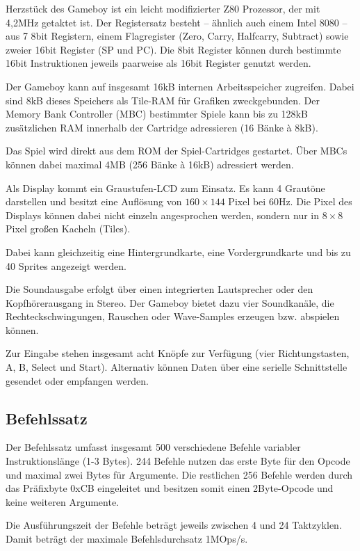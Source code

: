 \documentclass[a4paper]{scrartcl}
\begin{document}
Herzstück des Gameboy ist ein leicht modifizierter Z80 Prozessor, der mit 4,2MHz getaktet ist. Der Registersatz besteht -- ähnlich auch einem Intel 8080 -- aus 7 8bit Registern, einem Flagregister (Zero, Carry, Halfcarry, Subtract) sowie zweier 16bit Register (SP und PC). Die 8bit Register können durch bestimmte 16bit Instruktionen jeweils paarweise als 16bit Register genutzt werden.

Der Gameboy kann auf insgesamt 16kB internen Arbeitsspeicher zugreifen. Dabei sind 8kB dieses Speichers als Tile-RAM für Grafiken zweckgebunden. Der Memory Bank Controller (MBC) bestimmter Spiele kann bis zu 128kB zusätzlichen RAM innerhalb der Cartridge adressieren (16 Bänke à 8kB).

Das Spiel wird direkt aus dem ROM der Spiel-Cartridges gestartet. Über MBCs können dabei maximal 4MB (256 Bänke à 16kB) adressiert werden.

Als Display kommt ein Graustufen-LCD zum Einsatz. Es kann 4 Grautöne darstellen und besitzt eine Auflösung von $160 \times 144$ Pixel bei 60Hz. Die Pixel des Displays können dabei nicht einzeln angesprochen werden, sondern nur in $8 \times 8$ Pixel großen Kacheln (Tiles).

Dabei kann gleichzeitig eine Hintergrundkarte, eine Vordergrundkarte und bis zu 40 Sprites angezeigt werden.

Die Soundausgabe erfolgt über einen integrierten Lautsprecher oder den Kopfhörerausgang in Stereo. Der Gameboy bietet dazu vier Soundkanäle, die Rechteckschwingungen, Rauschen oder Wave-Samples erzeugen bzw. abspielen können.

Zur Eingabe stehen insgesamt acht Knöpfe zur Verfügung (vier Richtungstasten, A, B, Select und Start). Alternativ können Daten über eine serielle Schnittstelle gesendet oder empfangen werden.
\subsection{Befehlssatz}

Der Befehlssatz umfasst insgesamt 500 verschiedene Befehle variabler Instruktionslänge (1-3 Bytes). 244 Befehle nutzen das erste Byte für den Opcode und maximal zwei Bytes für Argumente. Die restlichen 256 Befehle werden durch das Präfixbyte 0xCB eingeleitet und besitzen somit einen 2Byte-Opcode und keine weiteren Argumente.

Die Ausführungszeit der Befehle beträgt jeweils zwischen 4 und 24 Taktzyklen. Damit beträgt der maximale Befehlsdurchsatz 1MOps/s.
\end{document}
